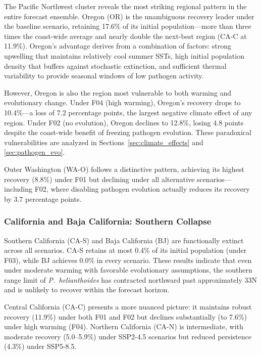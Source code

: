 The Pacific Northwest cluster reveals the most striking regional
pattern in the entire forecast ensemble.  Oregon (OR) is the
unambiguous recovery leader under the baseline scenario, retaining
17.6\% of its initial population---more than three times the coast-wide
average and nearly double the next-best region (CA-C at 11.9\%).
Oregon's advantage derives from a combination of factors: strong
upwelling that maintains relatively cool summer SSTs, high initial
population density that buffers against stochastic extinction, and
sufficient thermal variability to provide seasonal windows of low
pathogen activity.

However, Oregon is also the region most vulnerable to both warming and
evolutionary change.  Under F04 (high warming), Oregon's recovery drops
to 10.4\%---a loss of 7.2 percentage points, the largest negative
climate effect of any region.  Under F02 (no evolution), Oregon
declines to 12.8\%, losing 4.8 points despite the coast-wide benefit
of freezing pathogen evolution.  These paradoxical vulnerabilities are
analyzed in Sections~\ref{sec:climate_effects} and
\ref{sec:pathogen_evo}.

Outer Washington (WA-O) follows a distinctive pattern, achieving its
highest recovery (8.8\%) under F01 but declining under all alternative
scenarios---including F02, where disabling pathogen evolution actually
reduces its recovery by 3.7 percentage points.

\subsubsection{California and Baja California: Southern Collapse}

Southern California (CA-S) and Baja California (BJ) are functionally
extinct across all scenarios.  CA-S retains at most 0.4\% of its
initial population (under F03), while BJ achieves 0.0\% in every
scenario.  These results indicate that even under moderate warming with
favorable evolutionary assumptions, the southern range limit of
\textit{P.~helianthoides} has contracted northward past approximately
33\textdegree N and is unlikely to recover within the forecast horizon.

Central California (CA-C) presents a more nuanced picture: it maintains
robust recovery (11.9\%) under both F01 and F02 but declines
substantially (to 7.6\%) under high warming (F04).  Northern California
(CA-N) is intermediate, with moderate recovery (5.0--5.9\%) under
SSP2-4.5 scenarios but reduced persistence (4.3\%) under SSP5-8.5.

